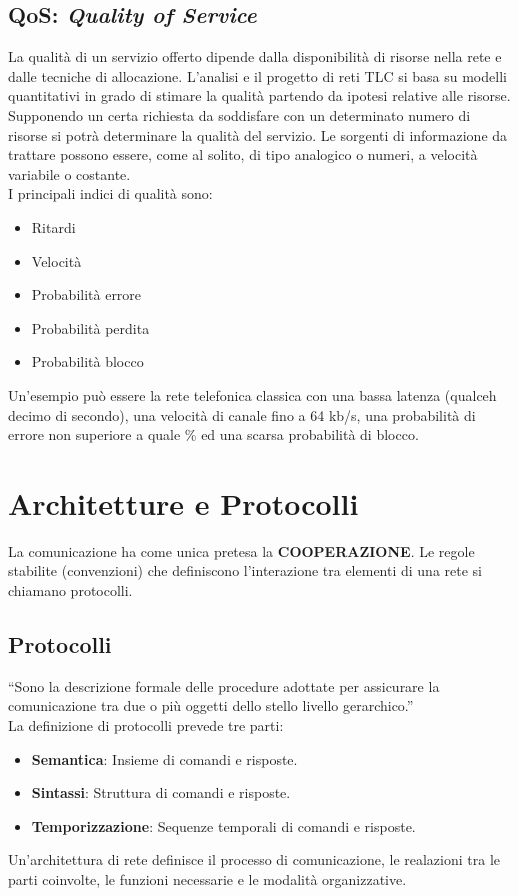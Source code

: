 \documentclass[12pt]{article}
\begin{document}
\subsection{QoS: \textit{Quality of Service}}
La qualità di un servizio offerto dipende dalla disponibilità di risorse nella rete e dalle tecniche di allocazione. L'analisi e il progetto di reti TLC si basa su modelli quantitativi in grado di stimare la qualità partendo da ipotesi relative alle risorse.\\
Supponendo un certa richiesta da soddisfare con un determinato numero di risorse si potrà determinare la qualità del servizio. Le sorgenti di informazione da trattare possono essere, come al solito, di tipo analogico o numeri, a velocità variabile o costante.\\
I principali indici di qualità sono:
\begin{itemize}
  \item Ritardi
  \item Velocità
  \item Probabilità errore
  \item Probabilità perdita
  \item Probabilità blocco
\end{itemize}
Un'esempio può essere la rete telefonica classica con una bassa latenza (qualceh decimo di secondo), una velocità di canale fino a 64 kb/s, una probabilità di errore non superiore a quale \% ed una scarsa probabilità di blocco.

\section{Architetture e Protocolli}
La comunicazione ha come unica pretesa la \textbf{COOPERAZIONE}. Le regole stabilite (convenzioni) che definiscono l'interazione tra elementi di una rete si chiamano protocolli.
\subsection{Protocolli}
``Sono la descrizione formale delle procedure adottate per assicurare la comunicazione tra due o più oggetti dello stello livello gerarchico.''\\
La definizione di protocolli prevede tre parti:
\begin{itemize}
  \item \textbf{Semantica}: Insieme di comandi e risposte.
  \item \textbf{Sintassi}: Struttura di comandi e risposte.
  \item \textbf{Temporizzazione}: Sequenze temporali di comandi e risposte.
\end{itemize}
Un'architettura di rete definisce il processo di comunicazione, le realazioni tra le parti coinvolte, le funzioni necessarie e le modalità organizzative.
\end{document}
